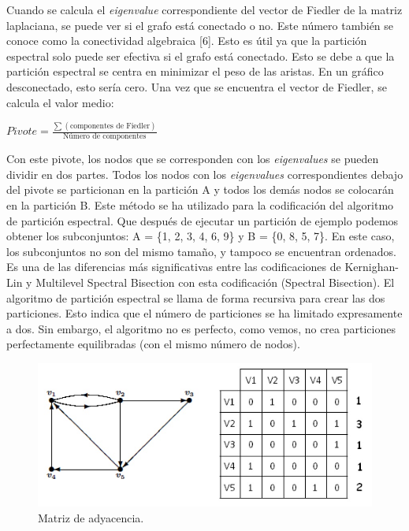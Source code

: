 Cuando se calcula el \textit{eigenvalue} correspondiente del vector de Fiedler de la matriz laplaciana, se puede ver si el grafo está conectado o no. Este número también se conoce como la conectividad algebraica [6]. Esto es útil ya que la partición espectral solo puede ser efectiva si el grafo está conectado. Esto se debe a que la partición espectral se centra en minimizar el peso de las aristas. En un gráfico desconectado, esto sería cero. Una vez que se encuentra el vector de Fiedler, se calcula el valor medio:

\begin{center}
	$Pivote = \frac{\sum (\text{componentes de Fiedler})}{\text{Número de componentes}}$
\end{center}

Con este pivote, los nodos que se corresponden con los \textit{eigenvalues} se pueden dividir en dos partes. Todos los nodos con los \textit{eigenvalues} correspondientes debajo del pivote se particionan en la partición A y todos los demás nodos se colocarán en la partición B. Este método se ha utilizado para la codificación del algoritmo de partición espectral. Que después de ejecutar un partición de ejemplo podemos obtener los subconjuntos: A = \{1, 2, 3, 4, 6, 9\} y B = \{0, 8, 5, 7\}. En este caso, los subconjuntos no son del mismo tamaño, y tampoco se encuentran ordenados. Es una de las diferencias más significativas entre las codificaciones de Kernighan-Lin y Multilevel Spectral Bisection con esta codificación (Spectral Bisection). El algoritmo de partición espectral se llama de forma recursiva para crear las dos particiones. Esto indica que el número de particiones se ha limitado expresamente a dos. Sin embargo, el algoritmo no es perfecto, como vemos, no crea particiones perfectamente equilibradas (con el mismo número de nodos).

\begin{figure}[h]
	\centering
	\includegraphics[scale=0.45]{Figures/matriz}
	\vspace{1mm}
	\caption{Matriz de adyacencia.}
	\label{matriz_adyacencia}
\end{figure}

